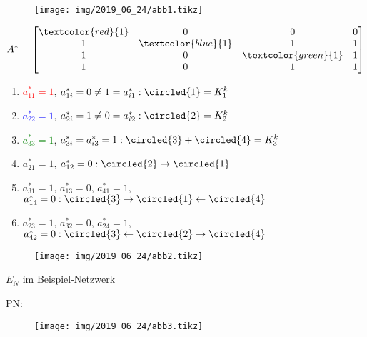 
\begin{figure}[H]
	\centering
	\texttt{[image: img/2019\_06\_24/abb1.tikz]}
\end{figure}

\begin{equation}
	A^\ast=
	\begin{bmatrix}
	\textcolor{red}{1} & 0 & 0 & 0 \\
	1 & \textcolor{blue}{1} & 1 & 1 \\
	1 & 0 & \textcolor{green}{1} & 1 \\
	1 & 0 & 1 & 1 \\
	\end{bmatrix}
\end{equation}


\begin{enumerate}[label=(\alph*)]
	\item \textcolor{red}{$a_{11}^\ast =1$}, $a_{1i}^\ast = 0 \neq 1 = a_{i1}^\ast: \circled{1}=K_1^k$
	\item \textcolor{blue}{$a_{22}^\ast = 1$}, $a_{2i}^\ast = 1 \neq 0 = a_{i2}^\ast: \circled{2}=K_2^k$
	\item \textcolor{green}{$a_{33}^\ast = 1$}, $a_{3i}^\ast = a_{i3}^\ast = 1: \circled{3}+\circled{4} = K_3^k$
	\item $a_{21}^\ast=1$, $a_{12}^\ast=0: \circled{2} \rightarrow \circled{1}$
	\item $a_{31}^\ast=1$, $a_{13}^\ast=0$, $a_{41}^\ast=1$, $a_{14}^\ast=0: \circled{3} \rightarrow \circled{1} \leftarrow \circled{4}$
	\item $a_{23}^\ast=1$, $a_{32}^\ast=0$, $a_{24}^\ast=1$, $a_{42}^\ast=0: \circled{3} \leftarrow \circled{2} \rightarrow \circled{4}$
\end{enumerate}

\begin{figure}[H]
	\centering
	\texttt{[image: img/2019\_06\_24/abb2.tikz]}
\end{figure}


$E_N$ im Beispiel-Netzwerk

\underline{PN:}

\begin{figure}[H]
	\centering
	\texttt{[image: img/2019\_06\_24/abb3.tikz]}
\end{figure}

